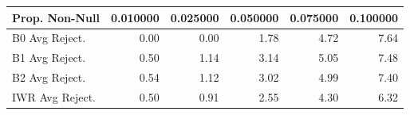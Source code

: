\begin{tabular}{lrrrrr}
\toprule
Prop. Non-Null & 0.010000 & 0.025000 & 0.050000 & 0.075000 & 0.100000 \\
\midrule
B0 Avg Reject. & 0.00 & 0.00 & 1.78 & 4.72 & 7.64 \\
B1 Avg Reject. & 0.50 & 1.14 & 3.14 & 5.05 & 7.48 \\
B2 Avg Reject. & 0.54 & 1.12 & 3.02 & 4.99 & 7.40 \\
IWR Avg Reject. & 0.50 & 0.91 & 2.55 & 4.30 & 6.32 \\
\bottomrule
\end{tabular}
